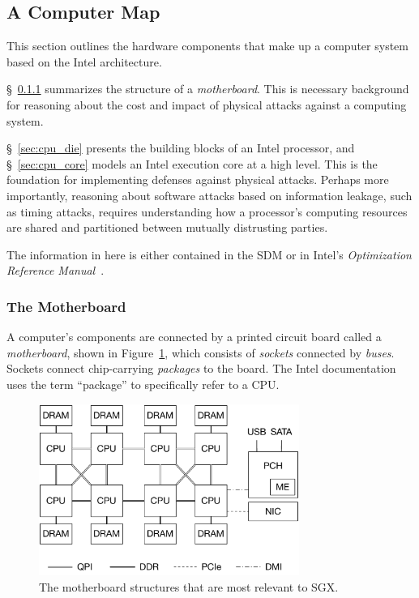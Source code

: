 \subsection{A Computer Map}
\label{sec:computer_map}

This section outlines the hardware components that make up a computer system
based on the Intel architecture.

\S~\ref{sec:motherboard} summarizes the structure of a \textit{motherboard}.
This is necessary background for reasoning about the cost and impact of
physical attacks against a computing system.

\S~\ref{sec:cpu_die} presents the building blocks of an Intel processor, and
\S~\ref{sec:cpu_core} models an Intel execution core at a high level. This is
the foundation for implementing defenses against physical attacks. Perhaps more
importantly, reasoning about software attacks based on information leakage,
such as timing attacks, requires understanding how a processor's computing
resources are shared and partitioned between mutually distrusting parties.

The information in here is either contained in the SDM or in Intel's
\textit{Optimization Reference Manual}~\cite{intel2014optimization}.


\subsubsection{The Motherboard}
\label{sec:motherboard}

A computer's components are connected by a printed circuit board called a
\textit{motherboard}, shown in Figure~\ref{fig:motherboard}, which consists of
\textit{sockets} connected by \textit{buses}. Sockets connect chip-carrying
\textit{packages} to the board. The Intel documentation uses the term
``package'' to specifically refer to a CPU.

\begin{figure}[hbt]
  \centering
  \includegraphics[width=85mm]{figures/motherboard.pdf}
  \caption{
    The motherboard structures that are most relevant to SGX.
  }
  \label{fig:motherboard}
\end{figure}

